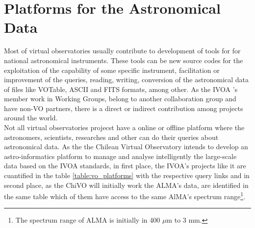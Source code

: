 \section{Platforms for the Astronomical Data}
Most of virtual observatories usually contribute to development of tools for
for national astronomical instruments. These tools can be new source codes for
the exploitation of the capability of some specific instrument, facilitation or
improvement of the queries, reading, writing, conversion of the astronomical
data of files like VOTable, ASCII and FITS formats, among other. As the IVOA 's
member work in Working Groups, belong to another collaboration group and have
non-VO partners, there is a direct or indirect contribution among projects
around the world.\\

Not all virtual observatories projecst have a online or offline platform where
the astronomers, scientists, researches and other can do their queries about
astronomical data. As the the Chilean Virtual Observatory intends to develop an
astro-informatics platform to manage and analyse intelligently the large-scale
data based on the IVOA standards, in first place, the IVOA's projects like it
are cuantified in the table \ref{table:vo_platforms} with the respective query
links and in second place, as the ChiVO will initially work the ALMA's data, are
identified in the same table which of them have access to the same AlMA's
spectrum range\footnote{The spectrum range of ALMA is initially in 400 $ \mu $m
to 3 mm.}.\\

